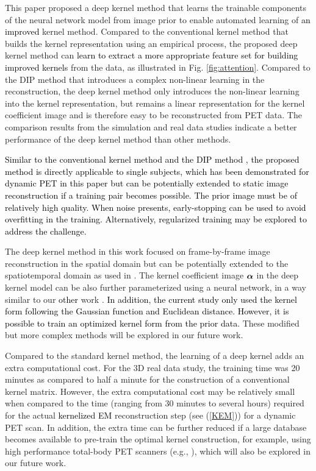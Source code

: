 \documentclass[]{IEEETran}
\newcommand{\txtb}[1]{\textcolor{black}{#1}}
\begin{document}
	This paper proposed a deep kernel method that learns the trainable components of the neural network model from image prior to enable automated learning of \txtb{an improved} kernel method. Compared to the conventional kernel method \cite{Wang2015} that builds the kernel representation using an empirical process, the proposed deep kernel method can \txtb{learn to extract a more appropriate feature set for building improved kernels} from the data, as illustrated in Fig. \ref{fig:attention}. Compared to the DIP method \cite{Gong2019} that introduces a complex non-linear learning in the reconstruction, the deep kernel method only introduces the non-linear learning into the kernel representation, but remains a linear representation for the kernel coefficient image and is therefore easy to be reconstructed from PET data. The comparison results from the simulation and real data studies indicate a better performance of the deep kernel method than other methods. 
	
	\txtb{Similar to the conventional kernel method \cite{Wang2015} and the DIP method \cite{Gong2019}, the proposed method is directly applicable to single subjects, which has been demonstrated for dynamic PET in this paper but can be potentially extended to static image reconstruction if a training pair becomes possible. The prior image must be of relatively high quality. When noise presents, early-stopping can be used to avoid overfitting in the training. Alternatively, regularized training may be explored to address the challenge.}
	
	The deep kernel method in this work focused on frame-by-frame image reconstruction in the spatial domain but can be potentially extended to the spatiotemporal domain as used in \cite{Wang2019}. The kernel coefficient image $\bm{\alpha}$ in the deep kernel model can be also further parameterized using a neural network, in a way similar to our \txtb{other} work \cite{Li2022}. \txtb{In addition, the current study only used the kernel form following the Gaussian function and Euclidean distance. However, it is possible to train an optimized kernel form from the prior data. } These modified but more complex methods will be explored in our future work.
	
	Compared to the standard kernel method, the learning of a deep kernel adds an extra computational cost. For the 3D real data study, the training time was 20 minutes as compared to half a minute for the construction of a conventional kernel matrix. However, the extra computational cost may be relatively small when compared to the time (ranging from 30 minutes to several hours) required for the actual \txtb{kernelized EM} reconstruction step (see (\ref{KEM})) for a dynamic PET scan. In addition, the extra time can be further reduced if a large database becomes available to pre-train the optimal kernel construction, for example, using high performance total-body PET scanners (e.g., \cite{Cherry2017, Badawi2019, Spencer2021, Karp2018, Pantel2020}), which will also be explored in our future work.
	
\end{document}

